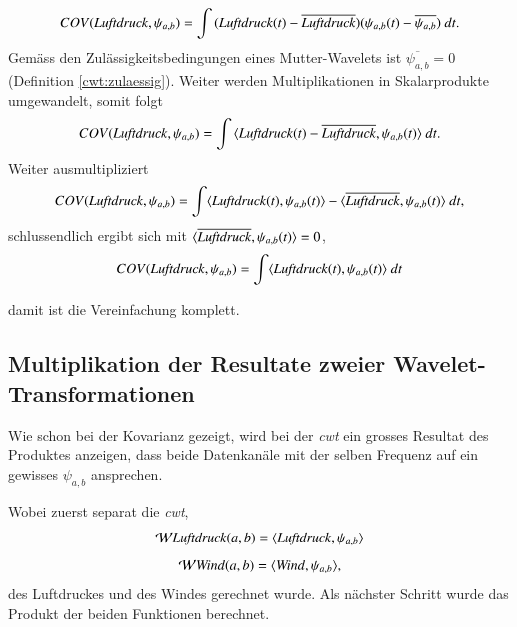 \begin{refsection}
\begin{equation}
COV(\text{\textit{Luftdruck}}, \psi_{a,b}) = \int{(\text{\textit{Luftdruck}}(t)- \overline{\text{\textit{Luftdruck}}})(\psi_{a,b}(t)- \overline{\psi_{a,b}}) \text{\space}dt}.
\end{equation}
Gemäss den Zulässigkeitsbedingungen eines Mutter-Wavelets ist $\overline{\psi_{a,b}} = 0$ (Definition \ref{cwt:zulaessig}). Weiter werden Multiplikationen in Skalarprodukte umgewandelt, somit folgt
\begin{equation}
COV(\text{\textit{Luftdruck}}, \psi_{a,b}) =  \int{\langle \text{\textit{Luftdruck}}(t)- \overline{\text{\textit{Luftdruck}}},\psi_{a,b}(t) \rangle \text{\space}dt}.
\end{equation}
Weiter ausmultipliziert
\begin{equation}
COV(\text{\textit{Luftdruck}}, \psi_{a,b}) = \int	\langle \text{\textit{Luftdruck}}(t),\psi_{a,b}(t)\rangle - \langle \overline{\text{\textit{Luftdruck}}},\psi_{a,b}(t)\rangle \text{\space}dt,
\end{equation}
schlussendlich ergibt sich mit $\langle \overline{\text{\textit{Luftdruck}}},\psi_{a,b}(t) \rangle = 0$,
\begin{equation}
\begin{split}
COV(\text{\textit{Luftdruck}}, \psi_{a,b}) &= \int \langle \text{\textit{Luftdruck}}(t),\psi_{a,b}(t)\rangle \text{\space}dt \\
\label{eq:wwt_kovarianz}
\end{split}
\end{equation}

damit ist die Vereinfachung komplett.


\subsection{Multiplikation der Resultate zweier Wavelet-Transformationen}

Wie schon bei der Kovarianz gezeigt, wird bei der \textit{cwt} ein grosses Resultat des Produktes anzeigen, dass beide Datenkanäle mit der selben Frequenz auf ein gewisses $\psi_{a,b}$ ansprechen.  

Wobei zuerst separat die \textit{cwt}, 
\begin{equation}
\mathcal{W}\text{\textit{Luftdruck}}(a,b) = \langle \text{\textit{Luftdruck}},\psi_{a,b}\rangle
\end{equation}
\begin{equation}
\mathcal{W}\text{\textit{Wind}}(a,b) = \langle \text{\textit{Wind}},\psi_{a,b}\rangle,
\end{equation}
des Luftdruckes und des Windes gerechnet wurde.
Als nächster Schritt wurde das Produkt der beiden Funktionen berechnet.


\end{refsection}
